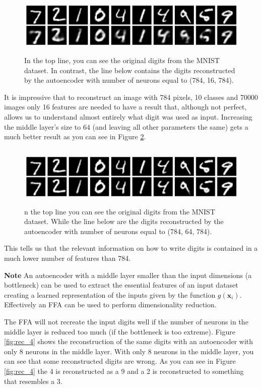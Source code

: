 \documentclass[12pt,a4]{article}
\newenvironment{note}
{\begin{mdframed}[backgroundcolor=light-gray, roundcorner=10pt,leftmargin=1, rightmargin=1, innerleftmargin=15, innertopmargin=15,innerbottommargin=15, outerlinewidth=1, linecolor=light-gray]}
{\end{mdframed}}
\begin{document}
\begin{figure}[hbt]
\centering
\includegraphics[width=12.61cm,height=2.92cm]{./images/image6.png}
\caption{In the top line, you can see the original digits from the MNIST dataset. In contrast, the line below contains the digits reconstructed by the autoencoder with number of neurons equal to (784, 16, 784).
}\label{fig:rec_2}
\end{figure}
It is impressive that to reconstruct an image with 784 pixels, 10 classes and 70000 images only 16 features are needed to have a result that, although not perfect, allows us to understand almost entirely what digit was used as input. Increasing the middle layer's size to \( 64\) (and leaving all other parameters the same) gets a much better result as you can see in Figure \ref{fig:rec_3}.
\begin{figure}[H]
\centering
\includegraphics[width=12.61cm,height=2.92cm]{./images/image7.png}
\caption{n the top line you can see the original digits from the MNIST dataset. While the line below are the digits reconstructed by the autoencoder with number of neurons equal to (784, 64, 784).}\label{fig:rec_3}
\end{figure}
This tells us that the relevant information on how to write digits is contained in a much lower number of features than 784. 
\begin{note}
\textbf{Note }An autoencoder with a middle layer smaller than the input dimensions (a bottleneck) can be used to extract the essential features of an input dataset creating a learned representation of the inputs given by the function \( g\left(\mathbf{x}_{i}\right)\). Effectively an FFA can be used to perform dimensionality reduction.
\end{note}
The FFA will not recreate the input digits well if the number of neurons in the middle layer is reduced too much (if the bottleneck is too extreme). Figure \ref{fig:rec_4} shows the reconstruction of the same digits with an autoencoder with only 8 neurons in the middle layer. With only 8 neurons in the middle layer, you can see that some reconstructed digits are wrong. As you can see in Figure \ref{fig:rec_4} the 4 is reconstructed as a 9 and a 2 is reconstructed to something that resembles a 3.
\end{document}
